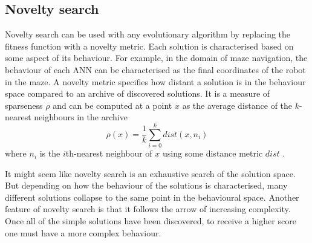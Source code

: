 \newpage
\subsection{Novelty search}
Novelty search can be used with any evolutionary algorithm by replacing the fitness
function with a novelty metric. Each solution is characterised based on some aspect
of its behaviour. For example, in the domain of maze navigation,
the behaviour of each ANN can be characterised as the
final coordinates of the robot in the maze. A novelty metric specifies how distant a solution
is in the behaviour space compared to an archive of discovered solutions. It is a measure
of sparseness $\rho$ and can be computed at a point $x$ as the average distance of the
$k$-nearest neighbours in the archive
\[
    \rho(x) = \frac{1}{k} \sum_{i=0}^{k} dist(x, n_{i})
\]
where $n_{i}$ is the $i$th-nearest neighbour of $x$ using some distance metric $dist$ \cite{novelty_alone}.

It might seem like novelty search is an exhaustive search of the solution space. But
depending on how the behaviour of the solutions is characterised, many different solutions
collapse to the same point in the behavioural space. Another feature of novelty search
is that it follows the arrow of increasing complexity. Once all of the simple solutions
have been discovered, to receive a higher score one must have a more complex behaviour.